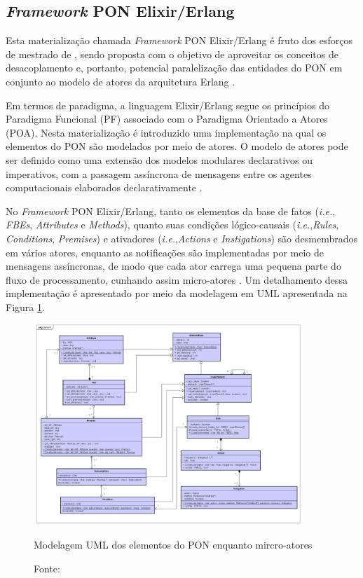 \subsection{\textit{Framework} PON Elixir/Erlang}

Esta materialização chamada \textit{Framework} PON Elixir/Erlang é fruto dos
esforços de mestrado de , sendo proposta com o
objetivo de aproveitar os conceitos de desacoplamento e, portanto, potencial
paralelização das entidades do PON em conjunto ao modelo de atores da
arquitetura Erlang \cite{msc_negrini_2019}.

Em termos de paradigma, a linguagem Elixir/Erlang segue os princípios do
Paradigma Funcional (PF) associado com o Paradigma Orientado a Atores (POA).
Nesta materialização é introduzido uma implementação na qual os elementos do PON
são modelados por meio de atores. O modelo de atores pode ser definido como uma
extensão dos modelos modulares declarativos ou imperativos, com a passagem
assíncrona de mensagens entre os agentes computacionais elaborados
declarativamente \cite{msc_negrini_2019}.

No \textit{Framework} PON Elixir/Erlang, tanto os elementos da base de fatos
(\textit{i.e.}, \textit{FBEs}, \textit{Attributes} e \textit{Methods}), quanto
suas condições lógico-causais (\textit{i.e.},\textit{Rules},
\textit{Conditions}, \textit{Premises}) e ativadores
(\textit{i.e.},\textit{Actions} e \textit{Instigations}) são desmembrados em
vários atores, enquanto as notificações são implementadas por meio de mensagens
assíncronas, de modo que cada ator carrega uma pequena parte do fluxo de
processamento, cunhando assim micro-atores \cite{msc_negrini_2019}. Um
detalhamento dessa implementação é apresentado por meio da modelagem em UML
apresentada na Figura \ref{fig:pon_elixir_uml}.

\begin{figure}[!htb]
  \centering
  \includegraphics[width=0.9\textwidth]{../figures/pon_elixir_uml.png}
  \smallskip
  \caption{Modelagem UML dos elementos do PON enquanto mircro-atores}
  \caption*{Fonte: }
  \label{fig:pon_elixir_uml}
\end{figure}
\FloatBarrier

